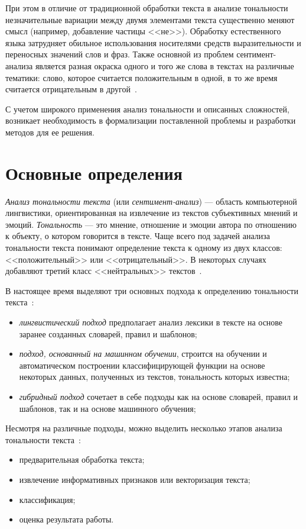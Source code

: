 При этом в отличие от традиционной обработки текста в анализе тональности
незначительные вариации между двумя элементами текста существенно меняют смысл
(например, добавление частицы <<не>>). Обработку естественного языка затрудняет
обильное использования носителями средств выразительности и переносных значений
слов и фраз. Также основной из проблем сентимент-анализа является разная окраска
одного и того же слова в текстах на различные тематики: слово, которое считается
положительным в одной, в то же время считается отрицательным в
другой~\cite{article03}.

С учетом широкого применения анализ тональности и описанных сложностей,
возникает необходимость в формализации поставленной проблемы и разработки
методов для ее решения.

\section{Основные определения}

\textit{Анализ тональности текста} (или \textit{сентимент-анализ}) --- область
компьютерной лингвистики, ориентированная на извлечение из текстов субъективных
мнений и эмоций. \textit{Тональность} --- это мнение, отношение и эмоции автора
по отношению к объекту, о котором говорится в тексте. Чаще всего под задачей
анализа тональности текста понимают определение текста к одному из двух классов:
<<положительный>> или <<отрицательный>>. В некоторых случаях добавляют третий
класс <<нейтральных>> текстов~\cite{article05}.

В настоящее время выделяют три основных подхода к определению тональности
текста~\cite{article05}:
\begin{itemize}
    \item \textit{лингвистический подход} предполагает анализ лексики в тексте на
        основе заранее созданных словарей, правил и шаблонов;

    \item \textit{подход, основанный на машинном обучении}, строится на обучении и
        автоматическом построении классифицирующей функции на основе
        некоторых данных, полученных из текстов, тональность которых
        известна;

    \item \textit{гибридный подход} сочетает в себе подходы как на основе
        словарей, правил и шаблонов, так и на основе машинного обучения;
\end{itemize}


Несмотря на различные подходы, можно выделить несколько этапов анализа
тональности текста~\cite{article09}:
\begin{itemize}
    \item предварительная обработка текста;
    \item извлечение информативных признаков или векторизация текста;
    \item классификация;
    \item оценка результата работы.
\end{itemize}

